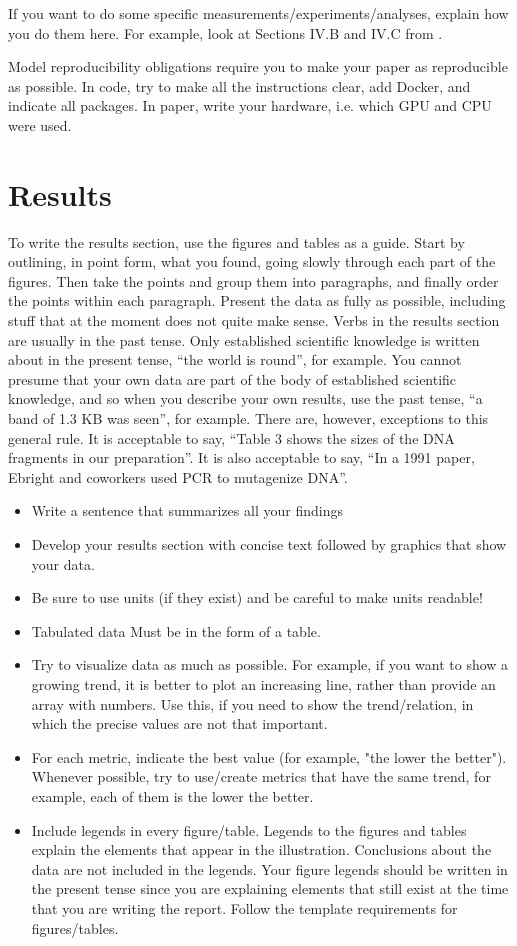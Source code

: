 \documentclass[10pt,conference,compsocconf]{IEEEtran}
\begin{document}
If you want to do some specific measurements/experiments/analyses, explain how you do them here. For example, look at Sections IV.B and IV.C from \cite{grinberg2023rawspectrogram}.

Model reproducibility obligations require you to make your paper as reproducible as possible. In code, try to make all the instructions clear, add Docker, and indicate all packages. In paper, write your hardware, i.e. which GPU and CPU were used. 

\section{Results}\label{sec:results}
To write the results section, use the figures and tables as a guide. Start by outlining, in point form, what you found, going slowly through each part of the figures. Then take the points and group them into paragraphs, and finally order the points within each paragraph. Present the data as fully as possible, including stuff that at the moment does not quite make sense. Verbs in the results section are usually in the past tense. Only established scientific knowledge is written about in the present tense, “the world is round”, for example. You cannot presume
that your own data are part of the body of established scientific knowledge, and so when you describe your own results, use the past tense, “a band of 1.3 KB was seen”, for example. There are, however, exceptions to this general rule. It is acceptable to say, “Table 3 shows the sizes of the DNA fragments in our preparation”. It is also acceptable to say, “In a 1991 paper, Ebright and coworkers used PCR to mutagenize DNA”.

\begin{itemize}
	\item Write a sentence that summarizes all your findings
	\item Develop your results section with concise text followed by graphics that show your data.
	\item Be sure to use units (if they exist) and be careful to make units readable!
	\item Tabulated data Must be in the form of a table.
	\item Try to visualize data as much as possible. For example, if you want to show a growing trend, it is better to plot an increasing line, rather than provide an array with numbers. Use this, if you need to show the trend/relation, in which the precise values are not that important.
	\item For each metric, indicate the best value (for example, "the lower the better"). Whenever possible, try to use/create metrics that have the same trend, for example, each of them is the lower the better.
	\item Include legends in every figure/table. Legends to the figures and tables explain the elements that appear in the illustration. Conclusions about the data are not included in the legends. Your figure legends should be written in the present tense since you are explaining elements that still exist at the time that you are writing the report. Follow the template requirements for figures/tables.
\end{itemize}
\end{document}
